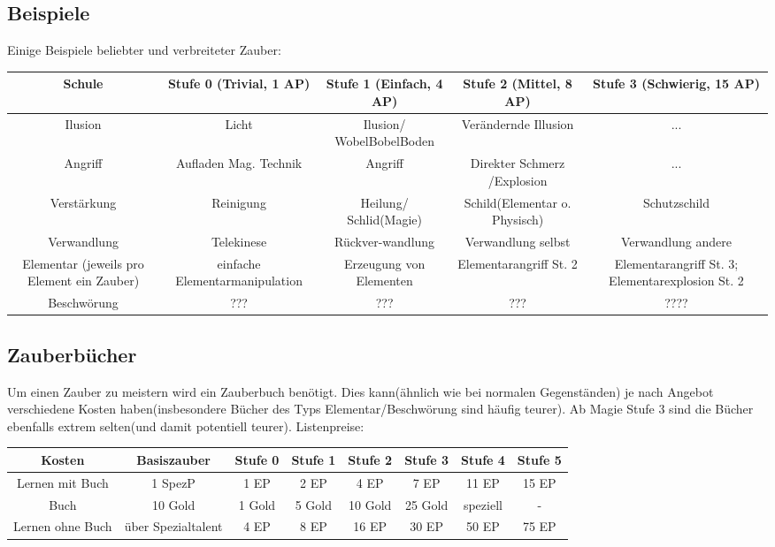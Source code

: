 \subsection{Beispiele}
Einige Beispiele beliebter und verbreiteter Zauber:
\begin{tabulary}{\textwidth}{|C||C|C|C|C|}
\hline 
Schule & Stufe 0 (Trivial, 1 AP) & Stufe 1 (Einfach, 4 AP) & Stufe 2 (Mittel, 8 AP) & Stufe 3 (Schwierig, 15 AP) \\ 
\hline 
\hline 
Ilusion & Licht & Ilusion/ WobelBobelBoden & Verändernde Illusion & ... \\ 
\hline 
Angriff & Aufladen Mag. Technik & Angriff & Direkter Schmerz /Explosion & ... \\ 
\hline 
Verstärkung & Reinigung & Heilung/ Schlid(Magie) & Schild(Elementar o. Physisch) & Schutzschild \\ 
\hline 
Verwandlung & Telekinese & Rückver-wandlung & Verwandlung selbst & Verwandlung andere \\ 
\hline 
Elementar (jeweils pro Element ein Zauber) & einfache Elementarmanipulation & Erzeugung von Elementen & Elementarangriff St. 2 & Elementarangriff St. 3; Elementarexplosion St. 2 \\ 
\hline 
Beschwörung & ??? & ??? & ??? & ???? \\ 
\hline 
\end{tabulary} 

\subsection{Zauberbücher}
Um einen Zauber zu meistern wird ein Zauberbuch benötigt. Dies kann(ähnlich wie bei normalen Gegenständen) je nach Angebot verschiedene Kosten haben(insbesondere Bücher des Typs Elementar/Beschwörung sind häufig teurer). Ab Magie Stufe 3 sind die Bücher ebenfalls extrem selten(und damit potentiell teurer). Listenpreise:
\begin{tabular}{|c||c|c|c|c|c|c|c|}
\hline 
Kosten & Basiszauber & Stufe 0 & Stufe 1 & Stufe 2 & Stufe 3 & Stufe 4 & Stufe 5\\ 
\hline 
\hline 
Lernen mit Buch & 1 SpezP & 1 EP & 2 EP & 4 EP & 7 EP & 11 EP & 15 EP\\ 
\hline 
Buch & 10 Gold & 1 Gold & 5 Gold & 10 Gold & 25 Gold & speziell & -\\ 
\hline 
\hline 
Lernen ohne Buch & über Spezialtalent & 4 EP & 8 EP & 16 EP & 30 EP & 50 EP & 75 EP\\ 
\hline 
\end{tabular} 

